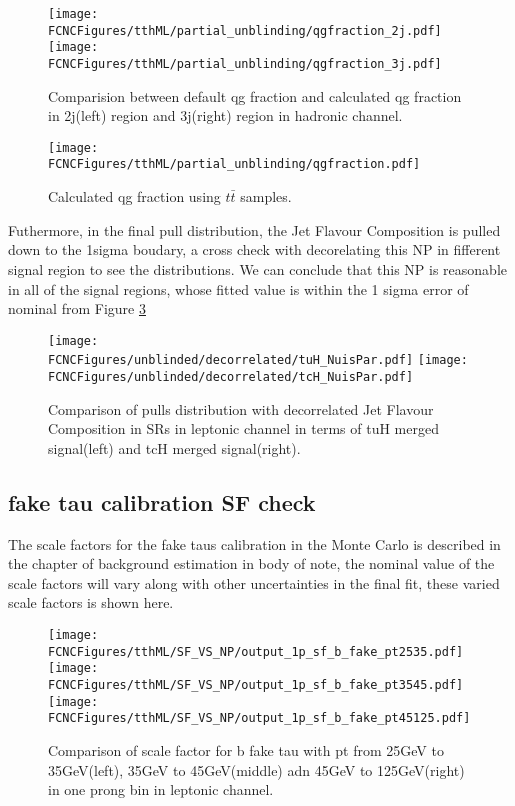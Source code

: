\begin{figure}[H]
\centering
\texttt{[image: \\FCNCFigures/tthML/partial\_unblinding/qgfraction\_2j.pdf]}
\texttt{[image: \\FCNCFigures/tthML/partial\_unblinding/qgfraction\_3j.pdf]}
\\
\caption{Comparision between default qg fraction and calculated qg fraction in 2j(left) region and 3j(right) region in hadronic channel.}
\label{fig:cal_and_defau_qg_frac}
\end{figure}

\begin{figure}[H]
\centering
\texttt{[image: \\FCNCFigures/tthML/partial\_unblinding/qgfraction.pdf]}
\\
\caption{Calculated qg fraction using $t\bar{t}$ samples.}
\label{fig:cal_qg_frac}
\end{figure}

Futhermore, in the final pull distribution, the Jet Flavour Composition is pulled down to the 1sigma boudary, a cross check with decorelating this NP in fifferent signal region to see the distributions. We can conclude that this NP is reasonable in all of the signal regions, whose fitted value is within the 1 sigma error of nominal from Figure \ref{fig:decorrelated_JFC}
\begin{figure}[H]
\centering
\texttt{[image: \\FCNCFigures/unblinded/decorrelated/tuH\_NuisPar.pdf]}
\texttt{[image: \\FCNCFigures/unblinded/decorrelated/tcH\_NuisPar.pdf]}
\\
\caption{Comparison of pulls distribution with decorrelated Jet Flavour Composition in SRs in leptonic channel in terms of tuH merged signal(left) and tcH merged signal(right).}
\label{fig:decorrelated_JFC}
\end{figure}



\subsection{fake tau calibration SF check}
The scale factors for the fake taus calibration in the Monte Carlo is described in the chapter of background estimation in body of note, the nominal value of the scale factors will vary along with other uncertainties in the final fit, these varied scale factors is shown here.

\begin{figure}[H]
\centering
\texttt{[image: \\FCNCFigures/tthML/SF\_VS\_NP/output\_1p\_sf\_b\_fake\_pt2535.pdf]}
\texttt{[image: \\FCNCFigures/tthML/SF\_VS\_NP/output\_1p\_sf\_b\_fake\_pt3545.pdf]}
\texttt{[image: \\FCNCFigures/tthML/SF\_VS\_NP/output\_1p\_sf\_b\_fake\_pt45125.pdf]}
\\
\caption{Comparison of scale factor for b fake tau with pt from 25GeV to 35GeV(left), 35GeV to 45GeV(middle) adn 45GeV to 125GeV(right) in one prong bin in leptonic channel.}
\label{fig:1p_sf_b_fake_pt2535}
\end{figure}

